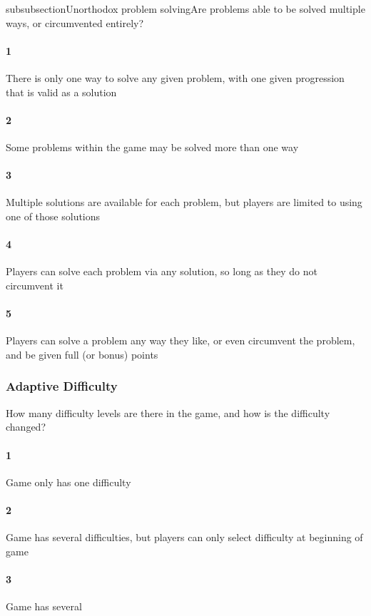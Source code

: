subsubsection{Unorthodox problem solving}Are problems able to be solved multiple ways, or circumvented entirely?\paragraph{1}There is only one way to solve any given problem, with one given progression that is valid as a solution\paragraph{2}Some problems within the game may be solved more than one way\paragraph{3}Multiple solutions are available for each problem, but players are limited to using one of those solutions\paragraph{4}Players can solve each problem via any solution, so long as they do not circumvent it\paragraph{5}Players can solve a problem any way they like, or even circumvent the problem, and be given full (or bonus) points\subsubsection{Adaptive Difficulty}How many difficulty levels are there in the game, and how is the difficulty changed?\paragraph{1}Game only has one difficulty\paragraph{2}Game has several difficulties, but players can only select difficulty at beginning of game\paragraph{3}Game has several 